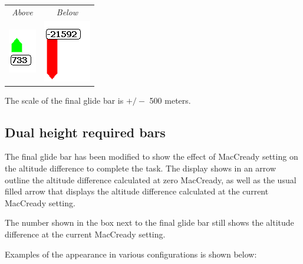 \documentclass[a4paper,12pt]{refrep}
\begin{document}
\begin{center}
\begin{tabular}{c c}
{\it Above} & {\it Below} \\
\includegraphics[angle=0,width=0.15\linewidth,keepaspectratio='true']{figures/cut-fg-above.png} &
\includegraphics[angle=0,width=0.2\linewidth,keepaspectratio='true']{figures/cut-fg-below.png} \\
\end{tabular}
\end{center}

The scale of the final glide bar is $+/-$ 500 meters.

\subsection*{Dual height required bars}

The final glide bar has been modified to show the effect of MacCready
setting on the altitude difference to complete the task.  The display
shows in an arrow outline the altitude difference calculated at zero
MacCready, as well as the usual filled arrow that displays the
altitude difference calculated at the current MacCready setting.

The number shown in the box next to the final glide bar still shows
the altitude difference at the current MacCready setting.

Examples of the appearance in various configurations is shown below:
\end{document}
